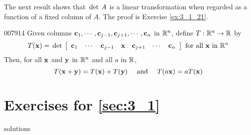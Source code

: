 The next result shows that $\thinspace\operatorname{det \medspace} A$ is a linear transformation when regarded as a function of a fixed column of $A$. The proof is Exercise \ref{ex:3_1_21}.

\begin{theorem}{}{007914}
Given columns $\textbf{c}_{1}, \cdots , \textbf{c}_{j-1}, \textbf{c}_{j+1}, \cdots , \textbf{c}_{n}$ in $\mathbb{R}^n$, define $T: \mathbb{R}^n \to \mathbb{R}$ by 
\begin{equation*}
T(\textbf{x}) = \thinspace\operatorname{det\medspace} \left[ 
\begin{array}{ccccccc}
\textbf{c}_1 & \cdots & \textbf{c}_{j-1} & \textbf{x} & \textbf{c}_{j+1} & \cdots & \textbf{c}_n
\end{array} \right]
\mbox{ for all } \textbf{x} \mbox{ in } \mathbb{R}^n
\end{equation*}
Then, for all $\textbf{x}$ and $\textbf{y}$ in $\mathbb{R}^n$ and all $a$ in $\mathbb{R}$,
\begin{equation*}
T(\textbf{x}+\textbf{y})= T(\textbf{x}) + T(\textbf{y}) \quad \mbox{ and } \quad T(a\textbf{x}) = aT(\textbf{x})
\end{equation*}
\end{theorem}

\section*{Exercises for \ref{sec:3_1}}

\begin{Filesave}{solutions}
\end{Filesave}

